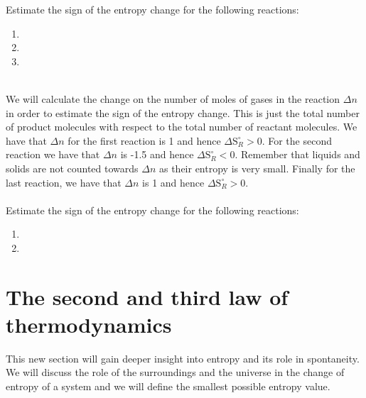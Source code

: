 \documentclass[main.tex]{subfiles}
\begin{document}
\begin{description}
\begin{example} %
Estimate the sign of the entropy change for the following reactions:
\begin{enumerate}[label=(\alph*)]
\item {}
\item {}
\item {}
\end{enumerate}
\\
We will calculate the change on the number of moles of gases in the reaction $\Delta n$ in order to estimate the sign of the entropy change. This is just the total number of product molecules with respect to the total number of reactant molecules. We have that $\Delta n$ for the first reaction is 1 and hence $\Delta \text{S}_R^{\circ}>0$. For the second reaction we have that  $\Delta n$ is -1.5 and hence $\Delta \text{S}_R^{\circ}<0$. Remember that liquids and solids are not counted towards $\Delta n$ as their entropy is very small. Finally for the last reaction, we have that $\Delta n$ is 1 and hence $\Delta \text{S}_R^{\circ}>0$.
\\
\faDiamond\ \\
Estimate the sign of the entropy change for the following reactions:
\begin{enumerate}[label=(\alph*)]
\item {}
\item {}
\end{enumerate}
\end{example}%






\end{description}



\section{The second and third law of thermodynamics}
This new section will gain deeper insight into entropy and its role in spontaneity. We will discuss the role of the surroundings and the universe in the change of entropy of a system and we will define the smallest possible entropy value. \sloppy
\end{document}
